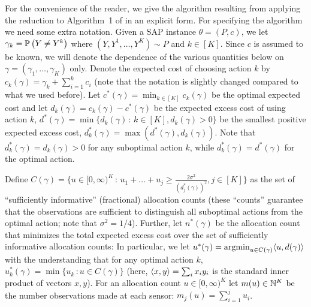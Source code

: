 For the convenience of the reader, we give the algorithm resulting from applying the reduction to Algorithm~1 
of \citet{WGySz:NIPS15} in an explicit form.
For specifying the algorithm we need some extra notation.
Given a SAP instance $\theta = (P,c)$, we let $\gamma_k = \mathbb{P}\left(Y\ne Y^k\right)$ where $(Y,Y^1,\dots,Y^K)\sim P$ and $k\in [K]$.
Since $c$ is assumed to be known, we will denote the dependence of the various quantities below
on $\gamma = (\gamma_1,\dots,\gamma_K)$ only.
Denote the expected cost of choosing action $k$ by $c_k(\gamma) = \gamma_k + \sum_{i=1}^k c_i$ 
(note that the notation is slightly changed compared to what we used before). 
Let $c^*(\gamma) = \min_{k\in [K]} c_k(\gamma)$ be the optimal expected cost and let 
$d_k(\gamma) = c_k(\gamma) - c^*(\gamma)$ be the expected excess cost of using action $k$,
$d^*(\gamma) = \min\{ d_k(\gamma)\,:\, k\in [K], d_k(\gamma)>0 \}$ be the smallest positive expected excess cost,
$d^*_k(\gamma) = \max(d^*(\gamma),d_k(\gamma))$.
Note that $d_k^*(\gamma) = d_k(\gamma)>0$ for any suboptimal
action $k$, while $d_k^*(\gamma) = d^*(\gamma)$ for the optimal action.

Define $C(\gamma) = \{ u\in [0,\infty)^K\,:\, u_1 + \dots + u_j \ge \frac{2\sigma^2}{(d_j^*(\gamma))^2}, j\in [K] \}$
as the set of ``sufficiently informative'' (fractional)  allocation counts 
(these ``counts'' guarantee that the observations are sufficient to distinguish all suboptimal actions from the optimal action; note that $\sigma^2=1/4$).
Further, let $n^*(\gamma)$
be the allocation count that minimizes the total expected excess cost over the set of sufficiently informative allocation counts:
In particular,  we let $u^*(\gamma) = \operatorname{argmin}_{u\in C(\gamma)} \langle  u, d(\gamma)  \rangle$ 
with the understanding that for any optimal action $k$, $u_k^*(\gamma) = \min \{ u_k \,: u\in C(\gamma) \}$ (here, $\langle x,y \rangle = \sum_i x_i y_i$ is the standard inner product of vectors $x,y$).
For an allocation count $u\in [0,\infty)^K$ let $m(u)\in \mathbb{N}^K$ be the number observations made at each sensor:
$m_j(u) = \sum_{i=1}^j u_i$.

